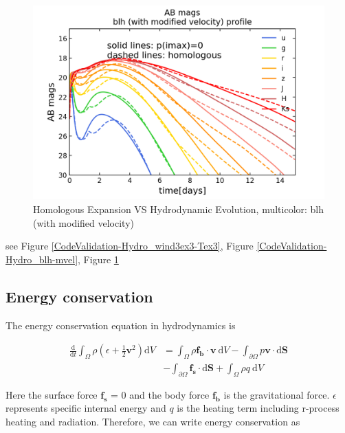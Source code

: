 \documentclass[fleqn,usenatbib]{mnras}
\begin{document}
\begin{figure}
\centering
\includegraphics[scale=0.5]{figures/CodeValidation-Hydrodynamics/ABmags_blh-mvel_zb_homologous.png}
\caption{Homologous Expansion VS Hydrodynamic Evolution, multicolor: blh (with modified velocity) }
\label{CodeValidation-Hydro_ABmags_blh-mvel}
\end{figure} 


see Figure \ref{CodeValidation-Hydro_wind3ex3-Tex3}, Figure \ref{CodeValidation-Hydro_blh-mvel}, Figure \ref{CodeValidation-Hydro_ABmags_blh-mvel}

\subsection{Energy conservation}

The energy conservation equation in hydrodynamics is 

 \begin{equation}
 \label{conservation_1}
 \begin{aligned}
 	 	\frac{\mathrm{d}}{\mathrm{d} t} \int_{\Omega} \rho\left(\epsilon+\frac{1}{2} \boldsymbol{v}^{2}\right) \mathrm{d} V & =\int_{\Omega} \rho \boldsymbol{f_b} \cdot \boldsymbol{v} \mathrm{~d} V -\int_{\partial \Omega} p \boldsymbol{v} \cdot \mathrm{d} \boldsymbol{S} \\&-\int_{\partial \Omega} \boldsymbol{f_s} \cdot \mathrm{d} \boldsymbol{S}+\int_{\Omega} \rho q \mathrm{~d}V
 \end{aligned}
 \end{equation}
 
 Here the surface force $\boldsymbol{f_s}$ = 0 and the body force $\boldsymbol{f_b}$ is the gravitational force. $\epsilon$ represents specific internal energy and $q$ is the heating term including r-process heating and radiation. Therefore, we can write energy conservation as
 
\end{document}
